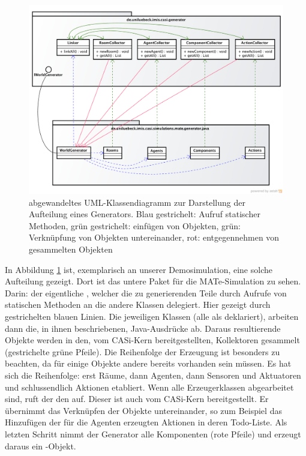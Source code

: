 \begin{figure}[htb]
  \begin{center}
    \includegraphics[width=\textwidth]{pics/howToGenerateAWorld.png}
  \end{center}
  \caption{abgewandeltes UML-Klassendiagramm zur Darstellung der Aufteilung eines Generators. Blau gestrichelt: Aufruf statischer Methoden, grün gestrichelt: einfügen von Objekten, grün: Verknüpfung von Objekten untereinander, rot: entgegennehmen von gesammelten Objekten}
  \label{fig:howToGenerateAWorld}
\end{figure}
In Abbildung \ref{fig:howToGenerateAWorld} ist, exemplarisch an unserer Demosimulation, eine solche Aufteilung gezeigt.
Dort ist das untere Paket für die MATe-Simulation zu sehen. Darin: der eigentliche , welcher die zu generierenden Teile durch Aufrufe von statischen Methoden an die andere Klassen delegiert. Hier gezeigt durch gestrichelten blauen Linien.
Die jeweiligen Klassen (alle als  deklariert), arbeiten dann die, in ihnen beschriebenen, Java-Ausdrücke ab.
Daraus resultierende Objekte werden in den, vom CASi-Kern bereitgestellten, Kollektoren gesammelt (gestrichelte grüne Pfeile). Die Reihenfolge der Erzeugung ist besonders zu beachten, da für einige Objekte andere bereits vorhanden sein müssen. Es hat sich die Reihenfolge: erst Räume, dann Agenten, dann Sensoren und Aktuatoren und schlussendlich Aktionen etabliert.
Wenn alle Erzeugerklassen abgearbeitet sind, ruft der  den  auf. Dieser ist auch vom CASi-Kern bereitgestellt. Er übernimmt das Verknüpfen der Objekte untereinander, so zum Beispiel das Hinzufügen der für die Agenten erzeugten Aktionen in deren Todo-Liste.
Als letzten Schritt nimmt der Generator alle Komponenten (rote Pfeile) und erzeugt daraus ein -Objekt.

